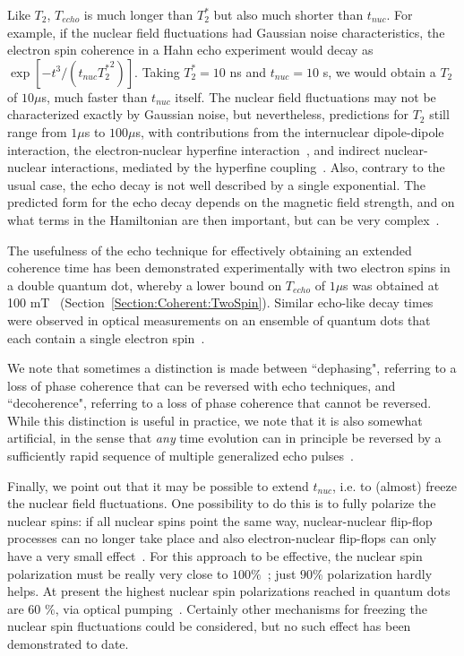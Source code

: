 \documentclass[rmp,twocolumn,aps]{revtex4}
\begin{document}
Like $T_2$, $T_{echo}$ is much longer than $T_2^*$ but also much shorter than $t_{nuc}$. For example, if the nuclear field fluctuations had Gaussian noise characteristics, the electron spin coherence in a Hahn echo experiment would decay as $\exp[- t^3 / (t_{nuc} {T_2^*}^2)]$\cite{hahn56}. Taking $T_2^* = 10$ ns and $t_{nuc} = 10$ s, we would obtain a $T_2$ of $10 \mu$s, much faster than $t_{nuc}$ itself. The nuclear field fluctuations may not be characterized exactly by Gaussian noise, but nevertheless, predictions for $T_2$ still range from $1 \mu$s to $100 \mu$s, with contributions from the internuclear dipole-dipole interaction\cite{sousa03c,witzel05,yao05}, the electron-nuclear hyperfine interaction~\cite{khaetskii02,coish04}, and indirect nuclear-nuclear interactions, mediated by the hyperfine coupling~\cite{yao05,shenvi05}. Also, contrary to the usual case, the echo decay is not well described by a single exponential. The predicted form for the echo decay depends on the magnetic field strength, and on what terms in the Hamiltonian are then important, but can be very complex~\cite{coish04,yao05,sousa06}.

The usefulness of the echo technique for effectively obtaining an extended coherence time has been demonstrated experimentally with two electron spins in a double quantum dot, whereby a lower bound on $T_{echo}$ of $1 \mu$s was obtained at 100 mT~\cite{petta05} (Section~\ref{Section:Coherent:TwoSpin}). Similar echo-like decay times were observed in optical measurements on an ensemble of quantum dots that each contain a single electron spin~\cite{greilich06b}. 

We note that sometimes a distinction is made between ``dephasing", referring to a loss of phase coherence that can be reversed with echo techniques, and ``decoherence", referring to a loss of phase coherence that cannot be reversed. While this distinction is useful in practice, we note that it is also somewhat artificial, in the sense that \emph{any} time evolution can in principle be reversed by a sufficiently rapid sequence of multiple generalized echo pulses~\cite{augustine97,viola98a,viola98b}.

Finally, we point out that it may be possible to extend $t_{nuc}$, i.e. to (almost) freeze the nuclear field fluctuations. One possibility to do this is to fully polarize the nuclear spins: if all nuclear spins point the same way, nuclear-nuclear flip-flop processes can no longer take place and also electron-nuclear flip-flops can only have a very small effect~\cite{khaetskii02,khaetskii03,schliemann02}. For this approach to be effective, the nuclear spin polarization must be really very close to $100\%$~\cite{schliemann02}; just $90\%$ polarization hardly helps. At present the highest nuclear spin polarizations reached in quantum dots are 60 $\%$, via optical pumping~\cite{bracker05a}. Certainly other mechanisms for freezing the nuclear spin fluctuations could be considered, but no such effect has been demonstrated to date.\\
\end{document}

